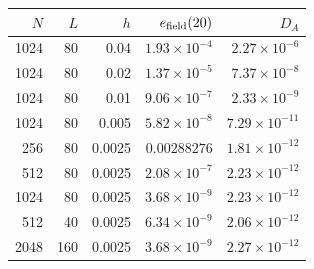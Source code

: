 \begin{tabular}{rrrrr}
\toprule
$N$ & $L$ & $h$ & $e_{\rm field}(20)$ & $D_A$ \\
\midrule
1024 & 80 & 0.04 & $1.93\times10^{-4}$ & $2.27\times10^{-6}$ \\
1024 & 80 & 0.02 & $1.37\times10^{-5}$ & $7.37\times10^{-8}$ \\
1024 & 80 & 0.01 & $9.06\times10^{-7}$ & $2.33\times10^{-9}$ \\
1024 & 80 & 0.005 & $5.82\times10^{-8}$ & $7.29\times10^{-11}$ \\
256 & 80 & 0.0025 & $0.00288276$ & $1.81\times10^{-12}$ \\
512 & 80 & 0.0025 & $2.08\times10^{-7}$ & $2.23\times10^{-12}$ \\
1024 & 80 & 0.0025 & $3.68\times10^{-9}$ & $2.23\times10^{-12}$ \\
512 & 40 & 0.0025 & $6.34\times10^{-9}$ & $2.06\times10^{-12}$ \\
2048 & 160 & 0.0025 & $3.68\times10^{-9}$ & $2.27\times10^{-12}$ \\
\bottomrule
\end{tabular}
